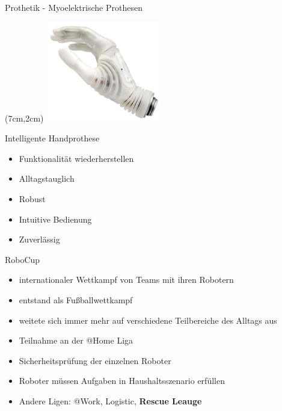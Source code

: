 \documentclass[10pt]{beamer}
\begin{document}
	\begin{frame}{Prothetik - Myoelektrische Prothesen}
		\begin{textblock*}{5cm}(7cm,2cm) %
			\includegraphics[width=5cm]{./pics/michelangelo-hand.jpg}
		\end{textblock*}
		Intelligente Handprothese
		\begin{itemize}
			\item Funktionalität wiederherstellen
			\item Alltagstauglich
			\item Robust
			\item Intuitive Bedienung
			\item Zuverlässig
		\end{itemize}
	\end{frame}

	\begin{frame}{RoboCup}
		\begin{itemize}
			\item internationaler Wettkampf von Teams mit ihren Robotern
			\item entstand als Fußballwettkampf
			\item weitete sich immer mehr auf verschiedene Teilbereiche des Alltags aus
			\item Teilnahme an der @Home Liga
			\item Sicherheitsprüfung der einzelnen Roboter
			\item Roboter müssen Aufgaben in Haushaltsszenario erfüllen
			\item Andere Ligen: @Work, Logistic, \textbf{Rescue Leauge}
		\end{itemize}
	\end{frame}
	
\end{document}

